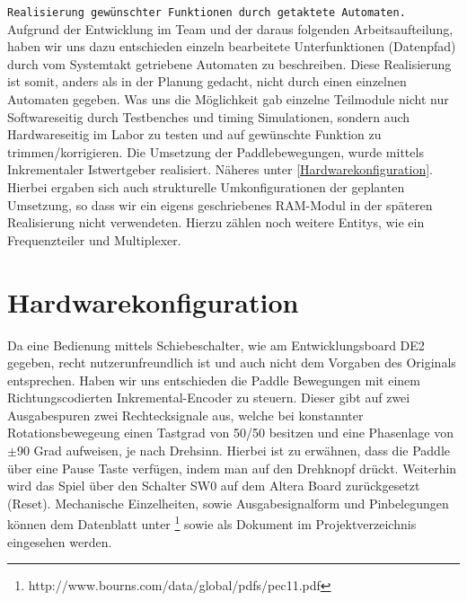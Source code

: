 \documentclass{article}
\begin{document}
\texttt{Realisierung gewünschter Funktionen durch getaktete Automaten.}
\newline
Aufgrund der Entwicklung im Team und der daraus folgenden Arbeitsaufteilung, haben wir uns dazu entschieden einzeln bearbeitete Unterfunktionen
(Datenpfad) durch vom Systemtakt getriebene Automaten zu beschreiben. Diese Realisierung ist somit, anders als in der Planung gedacht, nicht durch einen
einzelnen Automaten gegeben. Was uns die Möglichkeit gab einzelne Teilmodule nicht nur Softwareseitig durch Testbenches und timing Simulationen, sondern 
auch Hardwareseitig im Labor zu testen und auf gewünschte Funktion zu trimmen/korrigieren.
Die Umsetzung der Paddlebewegungen, wurde mittels Inkrementaler Istwertgeber realisiert. Näheres unter \ref{Hardwarekonfiguration}.
Hierbei ergaben sich auch strukturelle Umkonfigurationen der geplanten Umsetzung, so dass wir ein eigens geschriebenes RAM-Modul in der späteren Realisierung
nicht verwendeten. Hierzu zählen noch weitere Entitys, wie ein Frequenzteiler und Multiplexer.
\vspace{7.5mm}

\section{Hardwarekonfiguration}
\label{Hardwarekonfiguration}
Da eine Bedienung mittels Schiebeschalter, wie am Entwicklungsboard DE2 gegeben, recht nutzerunfreundlich ist und auch nicht dem Vorgaben des Originals entsprechen.
Haben wir uns entschieden die Paddle Bewegungen mit einem Richtungscodierten Inkremental-Encoder zu steuern.
Dieser gibt auf zwei Ausgabespuren zwei Rechtecksignale aus, welche bei konstannter Rotationsbewegeung einen Tastgrad von 50/50 besitzen und eine Phasenlage von
\(\pm\)90 Grad aufweisen, je nach Drehsinn.
Hierbei ist zu erwähnen, dass die Paddle über eine Pause Taste verfügen, indem man auf den Drehknopf drückt. Weiterhin wird das Spiel über den
Schalter SW0 auf dem Altera Board zurückgesetzt (Reset). 
\newline
 Mechanische Einzelheiten, sowie Ausgabesignalform und Pinbelegungen können dem Datenblatt unter 
\footnote{http://www.bourns.com/data/global/pdfs/pec11.pdf} sowie als Dokument im Projektverzeichnis eingesehen werden.
\end{document}
